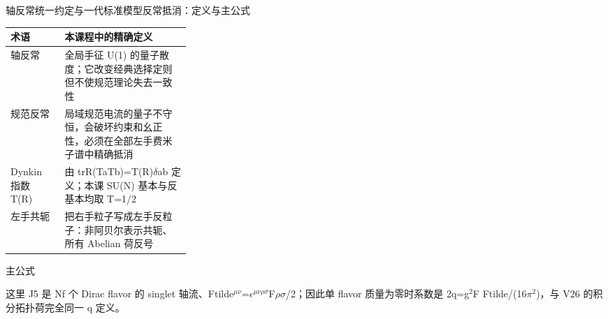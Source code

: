 \begin{frame}[t]{轴反常统一约定与一代标准模型反常抵消：定义与主公式}
\footnotesize\begin{tabularx}{\linewidth}{p{0.30\linewidth}Y}
\toprule 术语 & 本课程中的精确定义\\\midrule
{} 轴反常 & 全局手征 U(1) 的量子散度；它改变经典选择定则但不使规范理论失去一致性\\
 规范反常 & 局域规范电流的量子不守恒，会破坏约束和幺正性，必须在全部左手费米子谱中精确抵消\\
 Dynkin 指数 T(R) & 由 trR(TaTb)=T(R)\ensuremath{\delta}ab 定义；本课 SU(N) 基本与反基本均取 T=1/\allowbreak{}2\\
 左手共轭 & 把右手粒子写成左手反粒子：非阿贝尔表示共轭、所有 Abelian 荷反号\\
\bottomrule\end{tabularx}\vspace{0.15cm}
\begin{block}{ 主公式}\centering{}\end{block}
这里 J5 是 Nf 个 Dirac flavor 的 singlet 轴流、Ftilde\ensuremath{^{\mu\nu}}=\ensuremath{\epsilon}\ensuremath{^{\mu\nu\rho\sigma}}F\ensuremath{\rho}\ensuremath{\sigma}/\allowbreak{}2；因此单 flavor 质量为零时系数是 2q=g\ensuremath{^{2}}F Ftilde/\allowbreak{}(16\ensuremath{\pi}\ensuremath{^{2}})，与 V26 的积分拓扑荷完全同一 q 定义。
\end{frame}

